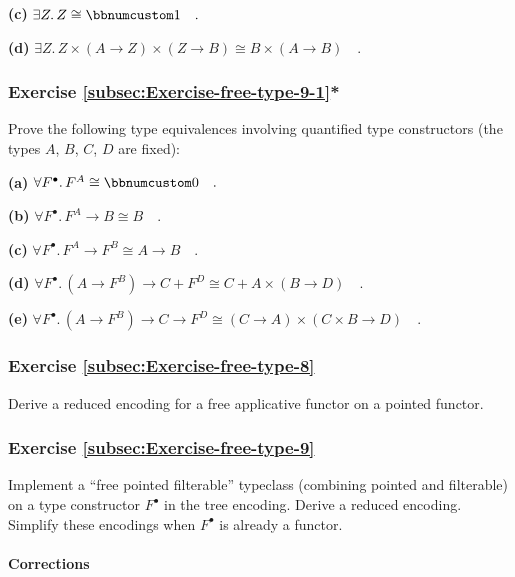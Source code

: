 \textbf{(c)} $\exists Z.\,Z\cong\bbnum 1\quad.$

\textbf{(d)} $\exists Z.\,Z\times\left(A\rightarrow Z\right)\times\left(Z\rightarrow B\right)\cong B\times\left(A\rightarrow B\right)\quad.$

\subsubsection{Exercise \label{subsec:Exercise-free-type-9-1}\ref{subsec:Exercise-free-type-9-1}{*}}

Prove the following type equivalences involving quantified type constructors
(the types $A$, $B$, $C$, $D$ are fixed):

\textbf{(a)} $\forall F^{\bullet}.\,F^{A}\cong\bbnum 0\quad.$

\textbf{(b)} $\forall F^{\bullet}.\,F^{A}\rightarrow B\cong B\quad.$

\textbf{(c)} $\forall F^{\bullet}.\,F^{A}\rightarrow F^{B}\cong A\rightarrow B\quad.$

\textbf{(d)} $\forall F^{\bullet}.\,\left(A\rightarrow F^{B}\right)\rightarrow C+F^{D}\cong C+A\times\left(B\rightarrow D\right)\quad.$

\textbf{(e)} $\forall F^{\bullet}.\,\left(A\rightarrow F^{B}\right)\rightarrow C\rightarrow F^{D}\cong\left(C\rightarrow A\right)\times\left(C\times B\rightarrow D\right)\quad.$

\subsubsection{Exercise \label{subsec:Exercise-free-type-8}\ref{subsec:Exercise-free-type-8}}

Derive a reduced encoding for a free applicative functor on a pointed
functor.

\subsubsection{Exercise \label{subsec:Exercise-free-type-9}\ref{subsec:Exercise-free-type-9}}

Implement a \textsf{``}free pointed filterable\textsf{''} typeclass (combining pointed
and filterable) on a type constructor $F^{\bullet}$ in the tree encoding.
Derive a reduced encoding. Simplify these encodings when $F^{\bullet}$
is already a functor.

\paragraph{Corrections}

